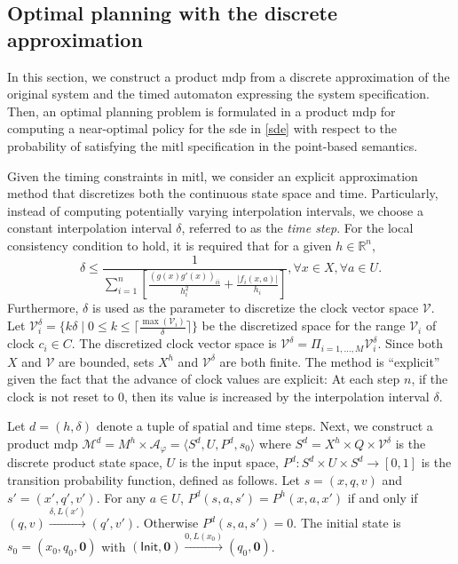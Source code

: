\documentclass[letterpaper, 10 pt, conference]{ieeeconf}
\newcommand{\calA}{\mathcal{A}}
\newcommand{\bbR}{\mathbb{R}}
\newcommand{\calV}{\mathcal{V}}
\newcommand{\calM}{\mathcal{M}}
\newcommand{\init}{\mathsf{Init}}
\providecommand{\abs}[1]{\left|#1\right|}
\begin{document}
\subsection{Optimal planning with the discrete approximation}
In this section, we construct a product \ac{mdp} from a discrete
approximation of the original system and the timed automaton
expressing the system specification.  Then, an optimal planning
problem is formulated in a product \ac{mdp} for computing a
near-optimal policy for the \ac{sde} in \eqref{sde} with respect to
the probability of satisfying the \ac{mitl} specification in the
point-based semantics.  






Given the timing constraints in \ac{mitl}, we consider an explicit
approximation method that discretizes both the continuous state space
and time. Particularly, instead of computing potentially varying
interpolation intervals, we choose a constant interpolation interval
$\delta$, referred to as the \emph{time step}. For the local
consistency condition to hold, it is required that for a given
$h\in \bbR^n$, 
\begin{equation}
\label{eq:constraintdelta}\delta \le \frac{1}{\sum_{i=1}^n\left[\frac{ (g(x)
      g'(x))_{ii}}{h_i^2} +\frac{\abs{f_i(x,a)}}{h_i}\right] },
\forall x\in X, \forall a\in U.\end{equation}
Furthermore, $\delta$ is used as the parameter to discretize the clock
vector space $\calV$. Let
$\calV_i^\delta = \{k \delta \mid 0\le k \le \lceil
\frac{\max(\calV_i)}{\delta} \rceil\}$
be the discretized space for the range $\calV_i$ of clock $c_i \in
C$.
The discretized clock vector space is
$\calV^\delta = \Pi_{i=1,\ldots,M} \calV_i^\delta$.  Since both $X$
and $\calV$ are bounded, sets $X^h$ and $\calV^\delta$ are both
finite.  The method is ``explicit'' given the fact that the advance of
clock values are explicit: At each step $n$, if the clock is not reset
to $0$, then its value is increased by the interpolation interval
$\delta$. 

 


Let $d=(h,\delta)$ denote a tuple of spatial and time steps. Next, we
construct a product \ac{mdp}
$\calM^d = M^h \times \calA_\varphi = \langle S^d, U, P^d, s_0
\rangle$
where $S^d = X^h \times Q\times \calV^\delta $ is the discrete product
state space, $U$ is the input space,
$P^d: S^d\times U \times S^d\rightarrow [0,1] $ is the transition
probability function, defined as follows. Let $s= (x,q,v)$ and
$s'=(x',q',v')$. For any $a\in U$, $P^d(s,a,s')= P^h(x,a,x')$ if and
only if $(q,v)\xrightarrow{\delta, L(x')} (q',v')$. Otherwise
$P^d(s,a,s')=0$. The initial state is $s_0 =(x_0,q_0,\bm 0 )$ with
$(\init, \bm 0) \xrightarrow{0,L(x_0)} (q_0, \bm 0)$.
\end{document}
